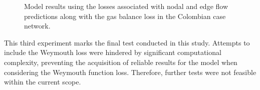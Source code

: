 \begin{figure}[htbp]
    \centering
    \setlength{}        
    \setlength{} 
    
    \caption{Model results using the losses associated with nodal and edge flow predictions along with the gas balance loss in the Colombian case network.}
    \label{fig:col_base_f_bal_results_non_lineal}
\end{figure}



This third experiment marks the final test conducted in this study. Attempts to include the Weymouth loss were hindered by significant computational complexity, preventing the acquisition of reliable results for the model when considering the Weymouth function loss. Therefore, further tests were not feasible within the current scope.



